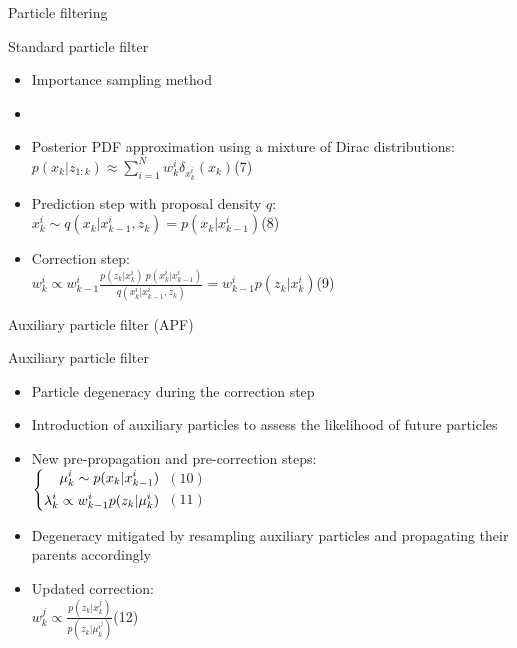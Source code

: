 \documentclass[9pt]{beamer}
\begin{document}
\begin{frame}{Particle filtering}

\begin{block}{Standard particle filter}
    \begin{itemize}
    \item Importance sampling method
    \item {}
    \item Posterior PDF approximation using a mixture of Dirac distributions:\\
    \hfill$\displaystyle p(x_k|z_{1:k})\approx\sum_{i=1}^Nw_k^i\delta_{x_k^i}(x_k)$\hfill(7)
    \item Prediction step with proposal density $q$:\vspace{0.5\baselineskip}\\
    \hfill$\displaystyle x_k^i\sim q(x_k|x_{k-1}^i,z_k)=p(x_k|x_{k-1}^i)$\hfill(8)
    \item Correction step:\\
    \hfill$\displaystyle w_k^i\propto w_{k-1}^i\frac{p(z_k|x_k^i)\:p(x_k^i|x_{k-1}^i)}{q(x_k^i|x_{k-1}^i,z_k)}=w_{k-1}^ip(z_k|x_k^i)$\hfill(9)
    \end{itemize}
\end{block}

\end{frame}

\begin{frame}{Auxiliary particle filter (APF)}

\begin{block}{Auxiliary particle filter}
    \begin{itemize}
    \item Particle degeneracy during the correction step
    \item[$\Rightarrow$] Introduction of auxiliary particles to assess the likelihood of future particles
    \item New pre-propagation and pre-correction steps:\\
    \hfill$\displaystyle\setlength\arraycolsep{1pt}\left\{\begin{aligned}
    \mu_k^i\sim p(x_k|x_{k-1}^i)\\
    \lambda_k^i\propto w_{k-1}^ip(z_k|\mu_k^i)
    \end{aligned}\right.$\hfill$\begin{aligned}(10)\\(11)\end{aligned}$
    \item Degeneracy mitigated by resampling auxiliary particles and propagating their parents accordingly
    \item Updated correction:\\
    \hfill$\displaystyle w_k^j\propto\frac{p(z_k|x_k^j)}{p(z_k|\mu_k^{i^j})}$\hfill(12)
    \end{itemize}
\end{block}

\end{frame}
\end{document}
